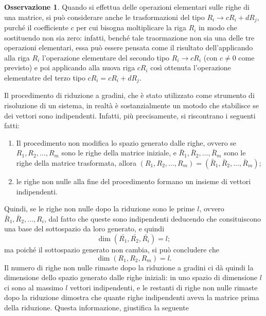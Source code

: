 \documentclass{book}
\theoremstyle{definition}
\newtheorem{oss}{Osservazione}[section]
\theoremstyle{plain}
\begin{document}
\begin{oss}
  \label{oss:guess-jorda1}
  Quando si effettua delle operazioni elementari sulle righe di una
  matrice, si può considerare anche le trasformazioni del tipo $R_i\to
  cR_i+dR_{j}$, purché il coefficiente $c$ per cui bisogna moltiplicare
  la riga $R_i$ in modo che sostituendo non sia zero: infatti, benché
  tale traormazione non sia una delle tre operazioni elementari, essa
  può essere pensata come il risultato dell'applicando alla riga $R_i$
  l'operazione elementare del secondo tipo $R_i\to cR_i$ (con $c\neq 0$
  come previsto) e poi applicando alla nuova riga $cR_i$ così ottenuta
  l'operazione elementatre del terzo tipo $cR_i=cR_i+dR_j$.
\end{oss}
Il procedimento di riduzione a gradini, che è stato utilizzato come
strumento di risoluzione di un sistema, in realtà è sostanzialmente un
motodo che stabilisce se dei vettori sono indipendenti. Infatti, più
precisamente, si riscontrano i seguenti fatti:
\begin{enumerate}
\item Il procedimento non modifica lo spazio generato dalle righe, ovvero
  se $R_1,R_2,\dots,R_m$ sono le righe della matrice iniziale, e
  $\bar{R}_1,\bar{R}_2,\dots,\bar{R}_m$ sono le righe della matrice
  trasformata, allora $(R_1,R_2,\dots,R_m)=(\bar{R}_1,\bar{R}_2,\dots,
  \bar{R}_m)$;
\item le righe non nulle alla fine del procedimento formano un insieme di
  vettori indipendenti.
\end{enumerate}
Quindi, se le righe non nulle dopo la riduzione sono le prime $l$, ovvero
$\bar{R}_1,\bar{R}_2,\dots,R_i$, dal fatto che queste sono indipendenti
deducendo che consituiscono una base del sottospazio da loro generato, e
quindi
\begin{equation*}
  \dim(\bar{R_1},\bar{R_2},\bar{R_i})=l;
\end{equation*}
ma poiché il sottospazio generato non cambia, si può concludere che
\begin{equation*}
  \dim(R_1,R_2,R_m)=l.
\end{equation*}
Il numero di righe non nulle rimaste dopo la riduzione a gradini ci dà
quindi la dimensione dello spazio generato dalle righe iniziali: in uno
spazio di dimensione $l$ ci sono al massimo $l$ vettori indipendenti, e
le restanti di righe non nulle rimaste dopo la riduzione dimostra che
quante righe indipendenti  aveva la matrice prima della riduzione. Questa
informazione, giustifica la seguente
\end{document}
